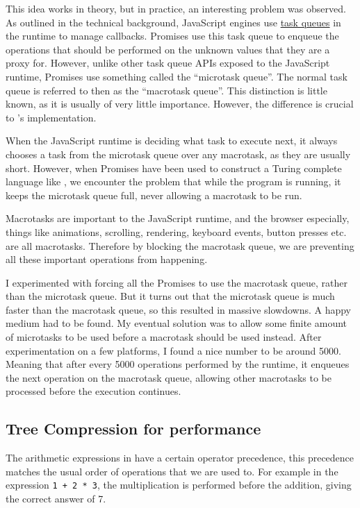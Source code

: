 This idea works in theory, but in practice, an interesting problem was observed. As outlined in the technical background, JavaScript engines use \hyperref[background:task-queues]{task queues} in the runtime to manage callbacks. Promises use this task queue to enqueue the operations that should be performed on the unknown values that they are a proxy for. However, unlike other task queue APIs exposed to the JavaScript runtime, Promises use something called the ``microtask queue''. The normal task queue is referred to then as the ``macrotask queue''. This distinction is little known, as it is usually of very little importance. However, the difference is crucial to \Setanta{}'s implementation.

When the JavaScript runtime is deciding what task to execute next, it always chooses a task from the microtask queue over any macrotask, as they are usually short. However, when Promises have been used to construct a Turing complete language like \Setanta{}, we encounter the problem that while the program is running, it keeps the microtask queue full, never allowing a macrotask to be run. 

Macrotasks are important to the JavaScript runtime, and the browser especially, things like animations, scrolling, rendering, keyboard events, button presses etc. are all macrotasks. Therefore by blocking the macrotask queue, we are preventing all these important operations from happening.

I experimented with forcing all the Promises to use the macrotask queue, rather than the microtask queue. But it turns out that the microtask queue is much faster than the macrotask queue, so this resulted in massive slowdowns. A happy medium had to be found.
My eventual solution was to allow some finite amount of microtasks to be used before a macrotask should be used instead. After experimentation on a few platforms, I found a nice number to be around 5000. Meaning that after every 5000 operations performed by the \Setanta{} runtime, it enqueues the next operation on the macrotask queue, allowing other macrotasks to be processed before the execution continues.

\subsection{Tree Compression for performance}
\label{solution:treecompression}

The arithmetic expressions in \Setanta{} have a certain operator precedence, this precedence matches the usual order of operations that we are used to. For example in the expression \verb|1 + 2 * 3|, the multiplication is performed before the addition, giving the correct answer of 7.

